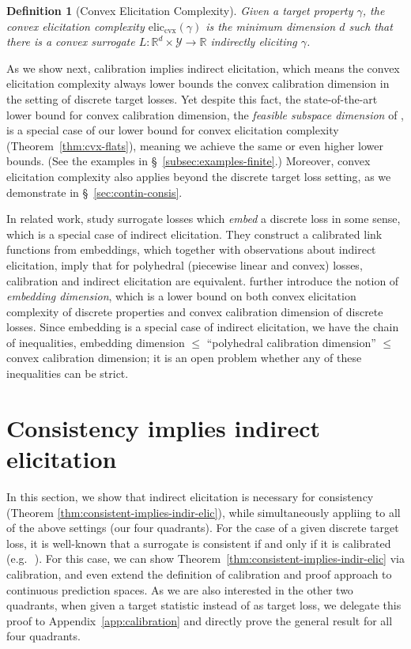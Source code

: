 \documentclass{article}
\newcommand{\reals}{\mathbb{R}}
\newcommand{\eliccvx}{\mathrm{elic}_\mathrm{cvx}}
\newcommand{\Y}{\mathcal{Y}}
\newtheorem{definition}{Definition}
\begin{document}
\begin{definition}[Convex Elicitation Complexity]
	Given a target property $\gamma$, the \emph{convex elicitation complexity} $\eliccvx(\gamma)$ is the minimum dimension $d$ such that there is a convex surrogate \mbox{$L : \reals^d \times \Y \to \reals$} indirectly eliciting $\gamma$.
\end{definition}

As we show next, calibration implies indirect elicitation, which means the convex elicitation complexity always lower bounds the convex calibration dimension in the setting of discrete target losses.
Yet despite this fact, the state-of-the-art lower bound for convex calibration dimension, the \emph{feasible subspace dimension} of \citet{ramaswamy2016convex}, is a special case of our lower bound for convex elicitation complexity (Theorem~\ref{thm:cvx-flats}), meaning we achieve the same or even higher lower bounds.
(See the examples in \S~\ref{subsec:examples-finite}.)
Moreover, convex elicitation complexity also applies beyond the discrete target loss setting, as we demonstrate in \S~\ref{sec:contin-consis}.

In related work,
\citet{finocchiaro2019embedding} study surrogate losses which \emph{embed} a discrete loss in some sense, which is a special case of indirect elicitation.
They construct a calibrated link functions from embeddings, which together with observations about indirect elicitation, imply that for polyhedral (piecewise linear and convex) losses, calibration and indirect elicitation are equivalent.
\citet{finocchiaro2020embedding} further introduce the notion of \emph{embedding dimension}, which is a lower bound on both convex elicitation complexity of discrete properties and convex calibration dimension of discrete losses.
Since embedding is a special case of indirect elicitation, we have the chain of inequalities, embedding dimension $\leq$  ``polyhedral calibration dimension'' $\leq$ convex calibration dimension; it is an open problem whether any of these inequalities can be strict.


\section{Consistency implies indirect elicitation}\label{sec:consis-implies-indir}

In this section, we show that indirect elicitation is necessary for consistency (Theorem \ref{thm:consistent-implies-indir-elic}), while simultaneously appliing to all of the above settings (our four quadrants).
For the case of a given discrete target loss, it is well-known that a surrogate is consistent if and only if it is calibrated (e.g.\,~\citep[Theorem 1, part 3]{bartlett2006convexity}).
For this case, we can show Theorem~\ref{thm:consistent-implies-indir-elic} via calibration, and even extend the definition of calibration and proof approach to continuous prediction spaces.
As we are also interested in the other two quadrants, when given a target statistic instead of as target loss,
we delegate this proof to Appendix~\ref{app:calibration} and directly prove the general result for all four quadrants.
\end{document}
